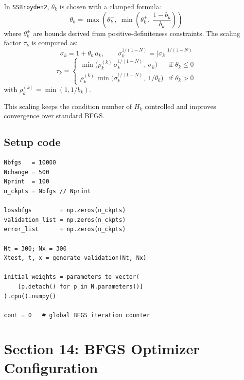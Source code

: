 \documentclass[11pt,a4paper]{article}
\begin{document}
In \texttt{SSBroyden2}, $\theta_k$ is chosen with a clamped formula:
\begin{equation}
  \theta_k = \max\!\left(\theta_k^{-},\;
    \min\!\left(\theta_k^{+},\; \frac{1-b_k}{b_k}\right)\right)
\label{eq:theta_clamp}
\end{equation}
where $\theta_k^{\pm}$ are bounds derived from positive-definiteness
constraints.  The scaling factor $\tau_k$ is computed as:
\begin{equation}
  \sigma_k = 1 + \theta_k\,a_k,
  \qquad
  \sigma_k^{1/(1-N)} = |\sigma_k|^{1/(1-N)}
\end{equation}
\begin{equation}
  \tau_k = \begin{cases}
    \min\!\bigl(\rho_k^{(k)}\,\sigma_k^{1/(1-N)},\; \sigma_k\bigr)
      & \text{if } \theta_k \le 0 \\
    \rho_k^{(k)}\,\min\!\bigl(\sigma_k^{1/(1-N)},\; 1/\theta_k\bigr)
      & \text{if } \theta_k > 0
  \end{cases}
\label{eq:tauk}
\end{equation}
with $\rho_k^{(k)} = \min(1, 1/b_k)$.

This scaling keeps the condition number of $H_k$ controlled and
improves convergence over standard BFGS.

\subsection*{Setup code}

\begin{lstlisting}
Nbfgs   = 10000
Nchange = 500
Nprint  = 100
n_ckpts = Nbfgs // Nprint

lossbfgs        = np.zeros(n_ckpts)
validation_list = np.zeros(n_ckpts)
error_list      = np.zeros(n_ckpts)

Nt = 300; Nx = 300
Xtest, t, x = generate_validation(Nt, Nx)

initial_weights = parameters_to_vector(
    [p.detach() for p in N.parameters()]
).cpu().numpy()

cont = 0   # global BFGS iteration counter
\end{lstlisting}


\section{Section 14: BFGS Optimizer Configuration}
\label{sec:bfgs_config}
\end{document}
